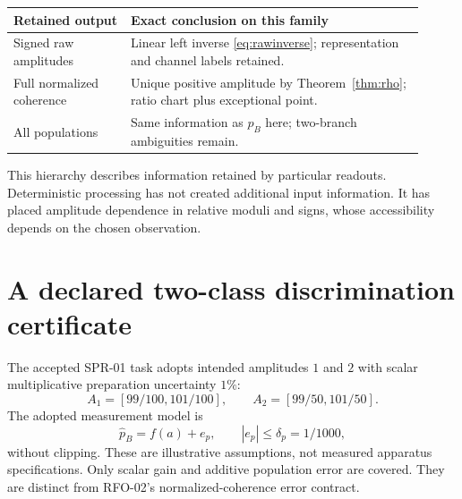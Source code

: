 \documentclass[11pt,a4paper]{article}
\begin{document}
\begin{center}
\begin{tabular}{@{}>{\raggedright\arraybackslash}p{0.26\linewidth}>{\raggedright\arraybackslash}p{0.65\linewidth}@{}}
\toprule
Retained output & Exact conclusion on this family\\\midrule
Signed raw amplitudes & Linear left inverse \eqref{eq:rawinverse}; representation and channel labels retained.\\[3pt]
Full normalized coherence & Unique positive amplitude by Theorem~\ref{thm:rho}; ratio chart plus exceptional point.\\[3pt]
All populations & Same information as $p_B$ here; two-branch ambiguities remain.\\\bottomrule
\end{tabular}
\end{center}
This hierarchy describes information retained by particular readouts. Deterministic processing has not created additional input information. It has placed amplitude dependence in relative moduli and signs, whose accessibility depends on the chosen observation.

\clearpage
\section{A declared two-class discrimination certificate}\label{sec:task}
The accepted SPR-01 task adopts intended amplitudes $1$ and $2$ with scalar multiplicative preparation uncertainty $1\%$:
\begin{equation}
A_1=[99/100,101/100],\qquad A_2=[99/50,101/50].
\end{equation}
The adopted measurement model is
\begin{equation}
\widehat p_B=f(a)+e_p,\qquad |e_p|\le\delta_p=1/1000,\label{eq:error}
\end{equation}
without clipping. These are illustrative assumptions, not measured apparatus specifications. Only scalar gain and additive population error are covered. They are distinct from RFO-02's normalized-coherence error contract.
\end{document}
